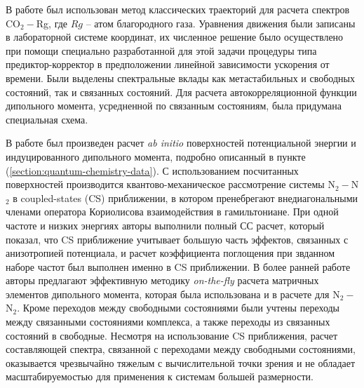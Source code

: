 В работе \cite{oparin2017} был использован метод классических траекторий для расчета спектров CO$_2-$Rg, где $Rg$ -- атом благородного газа. Уравнения движения были записаны в лабораторной системе координат, их численное решение было осуществлено при помощи специально разработанной для этой задачи процедуры типа предиктор-корректор в предположении линейной зависимости ускорения от времени. Были выделены спектральные вклады как метастабильных и свободных состояний, так и связанных состояний. Для расчета автокорреляционной функции дипольного момента, усредненной по связанным состояниям, была придумана специальная схема. \par 
В работе \cite{karman2015} был произведен расчет \textit{ab initio} поверхностей потенциальной энергии и индуцированного дипольного момента, подробно описанный в пункте (\ref{section:quantum-chemistry-data}). С использованием посчитанных поверхностей производится квантово-механическое рассмотрение системы N$_2-$N$_2$ в coupled-states (CS) приближении, в котором пренебрегают внедиагональными членами оператора Кориолисова взаимодействия в гамильтониане. При одной частоте и низких энергиях авторы выполнили полный СС расчет, который показал, что CS приближение учитывает большую часть эффектов, связанных с анизотропией потенциала, и расчет коэффициента поглощения при звданном наборе частот был выполнен именно в CS приближении. В более ранней работе \cite{karman2015_h2h2} авторы предлагают эффективную методику \textit{on-the-fly} расчета матричных элементов дипольного момента, которая была использована и в расчете для N$_2-$N$_2$. Кроме переходов между свободными состояниями были учтены переходы между связанными состояниями комплекса, а также переходы из связанных состояний в свободные. Несмотря на использование CS приближения, расчет составляющей спектра, связанной с переходами между свободными состояниями, оказывается чрезвычайно тяжелым с вычислительной точки зрения и не обладает масштабируемостью для применения к системам большей размерности. \par
